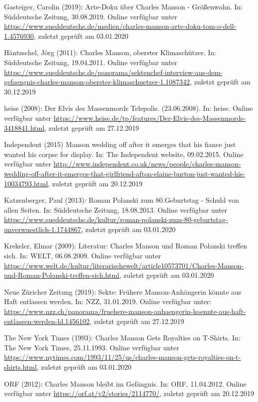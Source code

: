 \documentclass[
]{article}
\begin{document}
Gasteiger, Carolin (2019): Arte-Doku über Charles Manson - Größenwahn.
In: Süddeutsche Zeitung, 30.08.2019. Online verfügbar unter
\url{https://www.sueddeutsche.de/medien/charles-manson-arte-doku-tom-o-dell-1.4576930},
zuletzt geprüft am 03.01.2020

Häntzschel, Jörg (2011): Charles Manson, oberster Klimaschützer. In:
Süddeutsche Zeitung, 19.04.2011. Online verfügbar unter
\url{https://www.sueddeutsche.de/panorama/sektenchef-interview-aus-dem-gefaengnis-charles-manson-oberster-klimaschuetzer-1.1087342},
zuletzt geprüft am 30.12.2019

heise (2008): Der Elvis des Massenmords \textbar{} Telepolis.
(23.06.2008). In: heise. Online verfügbar unter
\url{https://www.heise.de/tp/features/Der-Elvis-des-Massenmords-3418841.html},
zuletzt geprüft am 27.12.2019

Independent (2015) Manson wedding off after it emerges that his fiance
just wanted his corpse for display. In: The Independent website,
09.02.2015. Online verfügbar unter
\url{http://www.independent.co.uk/news/people/charles-manson-wedding-off-after-it-emerges-that-girlfriend-afton-elaine-burton-just-wanted-his-10034793.html},
zuletzt geprüft am 20.12.2019

Katzenberger, Paul (2013): Roman Polanski zum 80.Geburtstag - Schuld von
allen Seiten. In: Süddeutsche Zeitung, 18.08.2013. Online verfügbar
unter
\url{https://www.sueddeutsche.de/kultur/roman-polanski-zum-80-geburtstag-unverwuestlich-1.1744867},
zuletzt geprüft am 03.01.2020

Krekeler, Elmar (2009): Literatur: Charles Manson und Roman Polanski
treffen sich. In: WELT, 06.08.2009. Online verfügbar unter
\url{https://www.welt.de/kultur/literarischewelt/article10573701/Charles-Manson-und-Roman-Polanski-treffen-sich.html},
zuletzt geprüft am 03.01.2020

Neue Züricher Zeitung (2019): Sekte: Frühere Manson-Anhängerin könnte
aus Haft entlassen werden. In: NZZ, 31.01.2019. Online verfügbar unter:
\url{https://www.nzz.ch/panorama/fruehere-manson-anhaengerin-koennte-aus-haft-entlassen-werden-ld.1456102},
zuletzt geprüft am 27.12.2019

The New York Times (1993): Charles Manson Gets Royalties on T-Shirts.
In: The New York Times, 25.11.1993. Online verfügbar unter
\url{https://www.nytimes.com/1993/11/25/us/charles-manson-gets-royalties-on-t-shirts.html},
zuletzt geprüft am 03.01.2020

ORF (2012): Charles Manson bleibt im Gefängnis. In: ORF, 11.04.2012.
Online verfügbar unter \url{https://orf.at/v2/stories/2114770/}, zuletzt
geprüft am 20.12.2019
\end{document}
